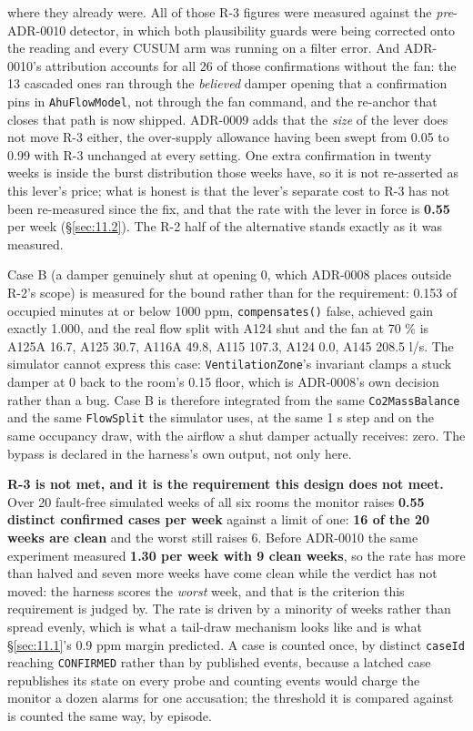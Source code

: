 where they already were. All of those R-3 figures were measured against the \emph{pre}-ADR-0010
detector, in which both plausibility guards were being corrected onto the reading and every CUSUM
arm was running on a filter error. And ADR-0010's attribution accounts for all 26 of those
confirmations without the fan: the 13 cascaded ones ran through the \emph{believed} damper opening
that a confirmation pins in \texttt{AhuFlowModel}, not through the fan command, and the re-anchor
that closes that path is now shipped. ADR-0009 adds that the \emph{size} of the lever does not move
R-3 either, the over-supply allowance having been swept from 0.05 to 0.99 with R-3 unchanged at
every setting. One extra confirmation in twenty weeks is inside the burst distribution those weeks
have, so it is not re-asserted as this lever's price; what is honest is that the lever's separate
cost to R-3 has not been re-measured since the fix, and that the rate with the lever in force is
\textbf{0.55} per week (§\ref{sec:11.2}). The R-2 half of the alternative stands exactly as it was measured.

Case B (a damper genuinely shut at opening 0, which ADR-0008 places outside R-2's scope) is
measured for the bound rather than for the requirement: 0.153 of occupied minutes at or below
1000 ppm, \texttt{compensates()} false, achieved gain exactly 1.000, and the real flow split with
A124 shut and the fan at 70 \% is A125A 16.7, A125 30.7, A116A 49.8, A115 107.3, A124 0.0, A145
208.5 l/s. The simulator cannot express this case: \texttt{VentilationZone}'s invariant clamps a
stuck damper at 0 back to the room's 0.15 floor, which is ADR-0008's own decision rather than a bug.
Case B is therefore integrated from the same \texttt{Co2MassBalance} and the same
\texttt{FlowSplit} the simulator uses, at the same 1 s step and on the same occupancy draw, with the
airflow a shut damper actually receives: zero. The bypass is declared in the harness's own output,
not only here.

\textbf{R-3 is not met, and it is the requirement this design does not meet.} Over 20 fault-free
simulated weeks of all six rooms the monitor raises \textbf{0.55 distinct confirmed cases per week}
against a limit of one: \textbf{16 of the 20 weeks are clean} and the worst still raises 6. Before
ADR-0010 the same experiment measured \textbf{1.30 per week with 9 clean weeks}, so the rate has
more than halved and seven more weeks have come clean while the verdict has not moved: the harness scores
the \emph{worst} week, and that is the criterion this requirement is judged by. The rate is driven
by a minority of weeks rather than spread evenly, which is what a tail-draw mechanism looks like
and is what §\ref{sec:11.1}'s 0.9 ppm margin predicted. A case is counted once, by distinct \texttt{caseId}
reaching \texttt{CONFIRMED} rather than by published events, because a latched case republishes its
state on every probe and counting events would charge the monitor a dozen alarms for one
accusation; the threshold it is compared against is counted the same way, by episode.

